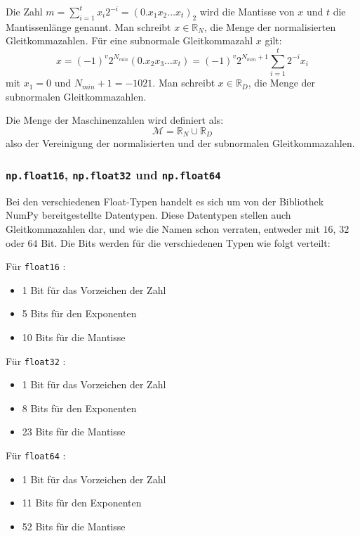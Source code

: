 \documentclass{scrartcl}
\begin{document}
Die Zahl \( m = \sum_{i=1}^{t}x_i 2^{-i} = (0.x_1x_2\ldots x_t)_2 \) wird die
Mantisse von \( x \) und \( t \) die Mantissenlänge genannt. Man schreibt \( x
\in \mathbb{R}_N \), die Menge der normalisierten Gleitkommazahlen. Für eine
subnormale Gleitkommazahl \( x \) gilt: \[ x = (-1)^v 2^{N_{min}}
    (0.x_2 x_3 \ldots x_t) = (-1)^v 2^{N_{min}+1} \sum_{i=1}^{t} 2^{-i} x_i \] mit \( x_1 = 0 \) und \( N_{min} + 1 = -1021 \). Man schreibt \( x \in
    \mathbb{R}_D \), die Menge der subnormalen Gleitkommazahlen.

Die Menge der Maschinenzahlen wird definiert als: \[ \mathcal{M} = \mathbb{R}_N
    \cup \mathbb{R}_D \] also der Vereinigung der normalisierten und der subnormalen
    Gleitkommazahlen.

\subsubsection{\texttt{np.float16}, \texttt{np.float32} und \texttt{np.float64}}
Bei den verschiedenen Float-Typen handelt es sich um von der Bibliothek NumPy
bereitgestellte Datentypen.
Diese Datentypen stellen auch Gleitkommazahlen dar, und wie die Namen schon
verraten, entweder mit \( 16 \), \( 32 \) oder \( 64 \) Bit.
Die Bits werden für die verschiedenen Typen wie folgt verteilt:

Für \texttt{float16} \cite{half-precision_floating-point_format}:
\begin{itemize}
    \item 1 Bit für das Vorzeichen der Zahl %
    \item 5 Bits für den Exponenten
    \item 10 Bits für die Mantisse
\end{itemize}

Für \texttt{float32} \cite{single-precision_floating-point_format}:
\begin{itemize}
    \item 1 Bit für das Vorzeichen der Zahl %
    \item 8 Bits für den Exponenten
    \item 23 Bits für die Mantisse
\end{itemize}

Für \texttt{float64} \cite{double-precision_floating-point_format}:
\begin{itemize}
    \item 1 Bit für das Vorzeichen der Zahl
    \item 11 Bits für den Exponenten
    \item 52 Bits für die Mantisse
\end{itemize}
\end{document}
